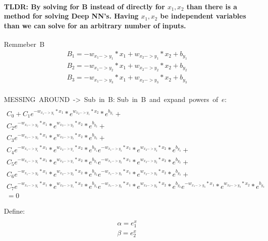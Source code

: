 \documentclass{article}
\begin{document}
\paragraph{TLDR: By solving for B instead of directly for $x_1, x_2$ than there is a method for solving Deep NN's. Having $x_1, x_2$ be independent
variables than we can solve for an arbitrary number of inputs.\newline} 

\hbox{Remmeber B}
\begin{multline}
    B_1 = -w_{x_1->y_1} * x_1 + w_{x_2->y_1} * x_2 + b_{y_1}\\
    B_2 = -w_{x_1->y_2} * x_1 + w_{x_2->y_2} * x_2 + b_{y_2}\\
    B_3 = -w_{x_1->y_3} * x_1 + w_{x_2->y_3} * x_2 + b_{y_3}\\
\end{multline}

\hbox{MESSING AROUND -> Sub in B:}
\hbox{Sub in B and expand powers of $e$:}
\begin{multline}\\
    C_0 + 
    C_1e^{-w_{x_1->y_1} * x_1}*e^{w_{x_2->y_1} * x_2}*e^{b_{y_1}} + \\
    C_2e^{-w_{x_1->y_2} * x_1}*e^{w_{x_2->y_2} * x_2}*e^{b_{y_2}} + \\
    C_3e^{-w_{x_1->y_3} * x_1}*e^{ w_{x_2->y_3} * x_2}*e^{b_{y_3}} + \\
    C_4e^{-w_{x_1->y_1} * x_1}*e^{w_{x_2->y_1} * x_2}*e^{b_{y_1}} e^{-w_{x_1->y_3} * x_1}*e^{ w_{x_2->y_3} * x_2}*e^{b_{y_3}} + \\
    C_5e^{-w_{x_1->y_1} * x_1}*e^{w_{x_2->y_1} * x_2}*e^{b_{y_1}} e^{-w_{x_1->y_2} * x_1}*e^{w_{x_2->y_2} * x_2}*e^{b_{y_2}} + \\
    C_6e^{-w_{x_1->y_2} * x_1}*e^{w_{x_2->y_2} * x_2}*e^{b_{y_2}} e^{-w_{x_1->y_3} * x_1}*e^{ w_{x_2->y_3} * x_2}*e^{b_{y_3}} + \\
    C_7e^{-w_{x_1->y_1} * x_1}*e^{w_{x_2->y_1} * x_2}*e^{b_{y_1}} e^{-w_{x_1->y_2} * x_1}*e^{w_{x_2->y_2} * x_2}*e^{b_{y_2}} e^{-w_{x_1->y_3} * x_1}*e^{ w_{x_2->y_3} * x_2}*e^{b_{y_3}} \\
    = 0
\end{multline}


\hbox{Define: }
\begin{multline}\\
    \alpha = e^x_1\\
    \beta = e^x_2
\end{multline}
\end{document}
